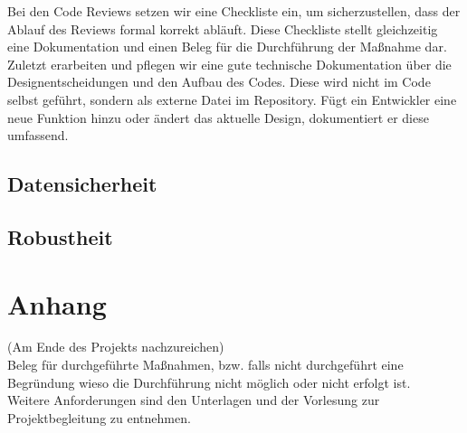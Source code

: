 \documentclass[accentcolor=tud0b,12pt,paper=a4]{tudreport}
\begin{document}
      Bei den Code Reviews setzen wir eine Checkliste ein, um sicherzustellen, dass der Ablauf des Reviews formal korrekt abläuft. Diese Checkliste stellt gleichzeitig eine Dokumentation und einen Beleg für die Durchführung der Maßnahme dar.\\

      Zuletzt erarbeiten und pflegen wir eine gute technische Dokumentation über die Designentscheidungen und den Aufbau des Codes. Diese wird nicht im Code selbst geführt, sondern als externe Datei im Repository. Fügt ein Entwickler eine neue Funktion hinzu oder ändert das aktuelle Design, dokumentiert er diese umfassend.

    \section{Datensicherheit}

    \section{Robustheit}

\appendix
  \chapter{Anhang}
    (Am Ende des Projekts nachzureichen)\\
    Beleg für durchgeführte Maßnahmen, bzw. falls nicht durchgeführt eine Begründung wieso die Durchführung nicht möglich oder nicht erfolgt ist. \\
    Weitere Anforderungen sind den Unterlagen und der Vorlesung zur Projektbegleitung zu entnehmen.
\end{document}
